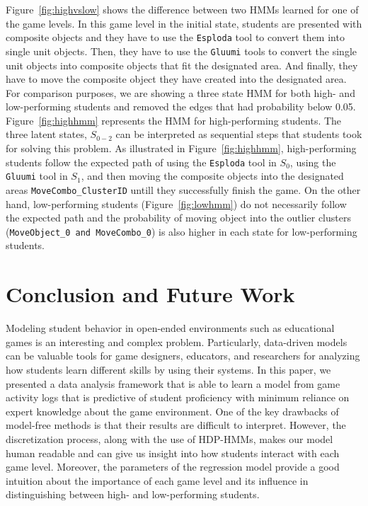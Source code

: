 \documentclass{sigchi}
\begin{document}
Figure~\ref{fig:highvslow} shows the difference between two HMMs learned for one of the game levels.
In this game level in the initial state, students are presented with composite objects and they have to use the \texttt{Esploda} tool to convert them into single unit objects. 
Then, they have to use the \texttt{Gluumi} tools to convert the single unit objects into composite objects that fit the designated area. 
And finally, they have to move the composite object they have created into the designated area.
For comparison purposes, we are showing a three state HMM for both high- and low-performing students and removed the edges that had probability below 0.05. 
Figure~\ref{fig:highhmm} represents the HMM for high-performing students. 
The three latent states, $S_{0-2}$ can be interpreted as sequential steps that students took for solving this problem. As illustrated in Figure~\ref{fig:highhmm}, high-performing students follow the expected path of using the \texttt{Esploda} tool in $S_0$, using the \texttt{Gluumi} tool in $S_1$, and then moving the composite objects into the designated areas \texttt{MoveCombo\_{ClusterID}} untill they successfully finish the game.
On the other hand, low-performing students (Figure~\ref{fig:lowhmm}) do not necessarily follow the expected path and the probability of moving object into the outlier clusters (\texttt{MoveObject\_0 and MoveCombo\_0}) is also higher in each state for low-performing students.

\section{Conclusion and Future Work}
Modeling student behavior in open-ended environments such as educational games is an interesting and complex problem. 
Particularly, data-driven models can be valuable tools for game designers, educators, and researchers for analyzing how students learn different skills by using their systems.
In this paper, we presented a data analysis framework that is able to learn a model from game activity logs that is predictive of student proficiency with minimum reliance on expert knowledge about the game environment. 
One of the key drawbacks of model-free methods is that their results are difficult to interpret. 
However, the discretization process, along with the use of HDP-HMMs, makes our model human readable and can give us insight into how students interact with each game level.
Moreover, the parameters of the regression model provide a good intuition about the importance of each game level and its influence in distinguishing between high- and low-performing students.
\end{document}
